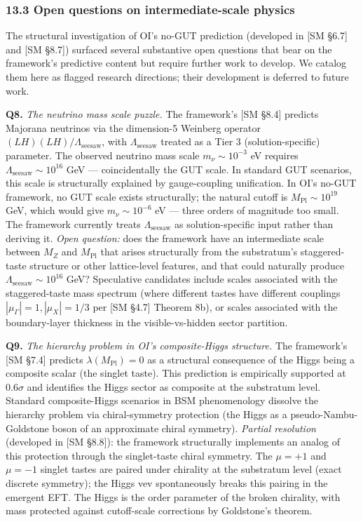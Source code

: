 \documentclass[
]{article}
\begin{document}
\hypertarget{open-questions-on-intermediate-scale-physics}{%
\subsubsection{13.3 Open questions on intermediate-scale
physics}\label{open-questions-on-intermediate-scale-physics}}

The structural investigation of OI's no-GUT prediction (developed in
{[}SM §6.7{]} and {[}SM §8.7{]}) surfaced several substantive open
questions that bear on the framework's predictive content but require
further work to develop. We catalog them here as flagged research
directions; their development is deferred to future work.

\textbf{Q8.} \emph{The neutrino mass scale puzzle.} The framework's
{[}SM §8.4{]} predicts Majorana neutrinos via the dimension-5 Weinberg
operator \((LH)(LH)/\Lambda_{\mathrm{seesaw}}\), with
\(\Lambda_{\mathrm{seesaw}}\) treated as a Tier 3 (solution-specific)
parameter. The observed neutrino mass scale \(m_\nu \sim 10^{-3}\) eV
requires \(\Lambda_{\mathrm{seesaw}} \sim 10^{16}\) GeV ---
coincidentally the GUT scale. In standard GUT scenarios, this scale is
structurally explained by gauge-coupling unification. In OI's no-GUT
framework, no GUT scale exists structurally; the natural cutoff is
\(M_{\mathrm{Pl}} \sim 10^{19}\) GeV, which would give
\(m_\nu \sim 10^{-6}\) eV --- three orders of magnitude too small. The
framework currently treats \(\Lambda_{\mathrm{seesaw}}\) as
solution-specific input rather than deriving it. \emph{Open question:}
does the framework have an intermediate scale between \(M_Z\) and
\(M_{\mathrm{Pl}}\) that arises structurally from the substratum's
staggered-taste structure or other lattice-level features, and that
could naturally produce \(\Lambda_{\mathrm{seesaw}} \sim 10^{16}\) GeV?
Speculative candidates include scales associated with the
staggered-taste mass spectrum (where different tastes have different
couplings \(|\mu_\Gamma| = 1, |\mu_X| = 1/3\) per {[}SM §4.7{]} Theorem
8b), or scales associated with the boundary-layer thickness in the
visible-vs-hidden sector partition.

\textbf{Q9.} \emph{The hierarchy problem in OI's composite-Higgs
structure.} The framework's {[}SM §7.4{]} predicts
\(\lambda(M_{\mathrm{Pl}}) = 0\) as a structural consequence of the
Higgs being a composite scalar (the singlet taste). This prediction is
empirically supported at \(0.6\sigma\) and identifies the Higgs sector
as composite at the substratum level. Standard composite-Higgs scenarios
in BSM phenomenology dissolve the hierarchy problem via chiral-symmetry
protection (the Higgs as a pseudo-Nambu-Goldstone boson of an
approximate chiral symmetry). \emph{Partial resolution} (developed in
{[}SM §8.8{]}): the framework structurally implements an analog of this
protection through the singlet-taste chiral symmetry. The \(\mu = +1\)
and \(\mu = -1\) singlet tastes are paired under chirality at the
substratum level (exact discrete symmetry); the Higgs vev spontaneously
breaks this pairing in the emergent EFT. The Higgs is the order
parameter of the broken chirality, with mass protected against
cutoff-scale corrections by Goldstone's theorem.
\end{document}
